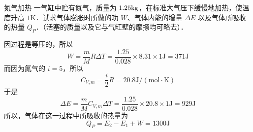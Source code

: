 \begin{example}{氮气加热}
一气缸中贮有氮气，质量为 $1.25\rm kg$，在标准大气压下缓慢地加热，使温度升高 $1\mathrm K$．试求气体膨胀时所做的功 $W$、气体内能的增量 $\Delta E$ 以及气体所吸收的热量 $Q_P$．（活塞的质量以及它与气缸壁的摩擦均可略去）．

因过程是等压的，所以
\begin{equation}
W=\frac{m}{M} R \Delta T=\frac{1.25}{0.028} \times 8.31 \times 1 \mathrm{J}=371 \mathrm{J}
\end{equation}
而因为氮气的 $i=5$，所以
\begin{equation}
C_{V, {m}}=\frac{i}{2} R=20.8 \mathrm{J} /(\mathrm{mol} \cdot \mathrm{K})
\end{equation}
于是
\begin{equation}
\Delta E=\frac{m}{M} C_{V, {m}} \Delta T=\frac{1.25}{0.028} \times 20.8 \times 1 \mathrm{J}=929 \mathrm{J}
\end{equation}
所以，气体在这一过程中所吸收的热量为
\begin{equation}
Q_{P}=E_{2}-E_{1}+W=1300 \mathrm{J}
\end{equation}
\end{example}

